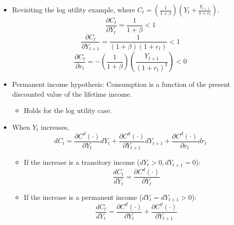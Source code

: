 \documentclass[notitlepage]{article}
\begin{document}
\begin{itemize}
\item Revisiting the log utility example, where $C_t = \left(\frac{1}{1+\beta}\right)\left(Y_t + \frac{Y_{t+1}}{1+r_t}\right)$.
\[
\frac{\partial C_t}{\partial Y_t} = \frac{1}{1+\beta} < 1
\]
\[
\frac{\partial C_t}{\partial Y_{t+1}} = \frac{1}{(1+\beta)(1+r_t)} < 1
\]
\[
\frac{\partial C_t}{\partial r_t} = -\left(\frac{1}{1+\beta}\right)\left(\frac{Y_{t+1}}{(1+r_t)^2}\right) < 0
\]

\item Permanent income hypothesis: Consumption is a function of the present discounted value of the lifetime income.
\begin{itemize}
\item Holds for the log utility case.
\end{itemize}

\item When $Y_t$ increases,
\[
dC_t = \frac{\partial C^d(\cdot)}{\partial Y_t}dY_t + \frac{\partial C^d(\cdot)}{\partial Y_{t+1}} dY_{t+1}+ \frac{\partial C^d(\cdot)}{\partial r_t}dr_t
\]
\begin{itemize}
\item If the increase is a transitory income ($dY_t>0,dY_{t+1}=0$):
\[
\frac{dC_t}{dY_t} = \frac{\partial C^d(\cdot)}{\partial Y_t}
\]
\item If the increase is a permanent income ($dY_t=dY_{t+1}>0$):
\[
\frac{dC_t}{dY_t} = \frac{\partial C^d(\cdot)}{\partial Y_t} + \frac{\partial C^d(\cdot)}{\partial Y_{t+1}}
\]
\end{itemize}


\end{itemize}
\end{document}
